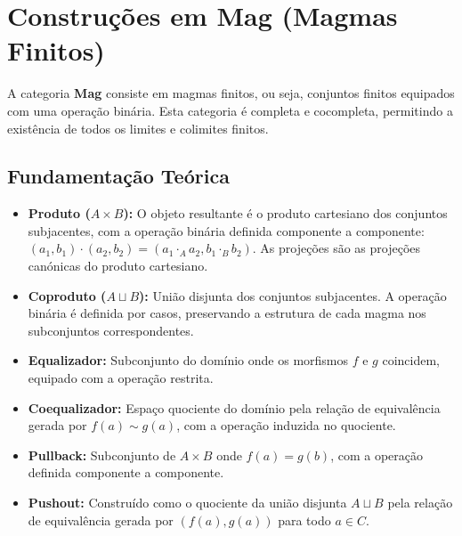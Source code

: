 \section{Construções em Mag (Magmas Finitos)}

A categoria \textbf{Mag} consiste em magmas finitos, ou seja, conjuntos finitos equipados com uma operação binária. Esta categoria é completa e cocompleta, permitindo a existência de todos os limites e colimites finitos.

\subsection{Fundamentação Teórica}
\begin{itemize}
    \item \textbf{Produto ($A \times B$):} O objeto resultante é o produto cartesiano dos conjuntos subjacentes, com a operação binária definida componente a componente: $(a_1, b_1) \cdot (a_2, b_2) = (a_1 \cdot_A a_2, b_1 \cdot_B b_2)$. As projeções são as projeções canónicas do produto cartesiano.
    \item \textbf{Coproduto ($A \sqcup B$):} União disjunta dos conjuntos subjacentes. A operação binária é definida por casos, preservando a estrutura de cada magma nos subconjuntos correspondentes.
    \item \textbf{Equalizador:} Subconjunto do domínio onde os morfismos $f$ e $g$ coincidem, equipado com a operação restrita.
    \item \textbf{Coequalizador:} Espaço quociente do domínio pela relação de equivalência gerada por $f(a) \sim g(a)$, com a operação induzida no quociente.
    \item \textbf{Pullback:} Subconjunto de $A \times B$ onde $f(a) = g(b)$, com a operação definida componente a componente.
    \item \textbf{Pushout:} Construído como o quociente da união disjunta $A \sqcup B$ pela relação de equivalência gerada por $(f(a), g(a))$ para todo $a \in C$.
\end{itemize}

